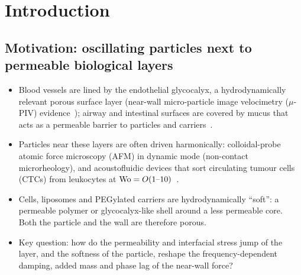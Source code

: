 \section{Introduction}\label{sec:intro}

\subsection*{Motivation: oscillating particles next to permeable biological layers}
\begin{itemize}
  \item Blood vessels are lined by the endothelial glycocalyx, a hydrodynamically relevant porous surface layer
        (near-wall micro-particle image velocimetry ($\mu$-PIV) evidence~\cite{smith2003near}); airway and intestinal surfaces are covered by mucus
        that acts as a permeable barrier to particles and carriers~\cite{pangeni2023airway}.
  \item Particles near these layers are often driven harmonically: colloidal-probe atomic force microscopy (AFM) in dynamic mode
        (non-contact microrheology), and acoustofluidic devices that sort circulating tumour cells (CTCs) from
        leukocytes at $\mathrm{Wo}=O(1\text{--}10)$~\cite{wu2019acoustofluidic,hossein2023review}.
  \item Cells, liposomes and PEGylated carriers are hydrodynamically ``soft'': a permeable polymer or glycocalyx-like
        shell around a less permeable core. Both the particle and the wall are therefore porous.
  \item Key question: how do the permeability and interfacial stress jump of the layer, and the softness of the particle,
        reshape the frequency-dependent damping, added mass and phase lag of the near-wall force?
\end{itemize}

